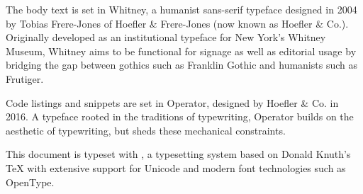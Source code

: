 \newpage
\begin{center}
    \begin{minipage}[c]{0.6\textwidth}
    \begin{colophon}
    The body text is set in Whitney, a humanist sans-serif typeface designed in 2004 by Tobias Frere-Jones of Hoefler \& Frere-Jones (now known as Hoefler \& Co.). Originally developed as an institutional typeface for New York's Whitney Museum, Whitney aims to be functional for signage as well as editorial usage by bridging the gap between gothics such as Franklin Gothic and humanists such as Frutiger.
    
    \medskip
    Code listings and snippets are set in Operator, designed by Hoefler \& Co. in 2016. A typeface rooted in the traditions of typewriting, Operator builds on the aesthetic of typewriting, but sheds these mechanical constraints.
    
    \medskip
    This document is typeset with \XeLaTeX, a typesetting system based on Donald Knuth's \TeX{} with extensive support for Unicode and modern font technologies such as OpenType.
    \end{colophon}
    \end{minipage}
\end{center}